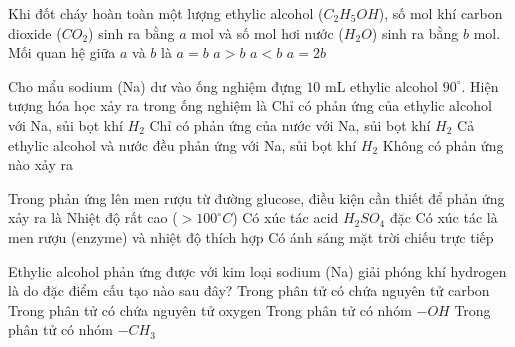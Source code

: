 \begin{ex}%
	Khi đốt cháy hoàn toàn một lượng ethylic alcohol ($C_2H_5OH$), số mol khí carbon dioxide ($CO_2$) sinh ra bằng $a$ mol và số mol hơi nước ($H_2O$) sinh ra bằng $b$ mol. Mối quan hệ giữa $a$ và $b$ là
	\choice
	{$a = b$}
	{$a > b$}
	{\True $a < b$}
	{$a = 2b$}
\end{ex}

\begin{ex}%
	Cho mẩu sodium (Na) dư vào ống nghiệm đựng $10$ mL ethylic alcohol $90^\circ$. Hiện tượng hóa học xảy ra trong ống nghiệm là
	\choice
	{Chỉ có phản ứng của ethylic alcohol với Na, sủi bọt khí $H_2$}
	{Chỉ có phản ứng của nước với Na, sủi bọt khí $H_2$}
	{\True Cả ethylic alcohol và nước đều phản ứng với Na, sủi bọt khí $H_2$}
	{Không có phản ứng nào xảy ra}
\end{ex}

\begin{ex}%
	Trong phản ứng lên men rượu từ đường glucose, điều kiện cần thiết để phản ứng xảy ra là
	\choice
	{Nhiệt độ rất cao ($> 100^\circ C$)}
	{Có xúc tác acid $H_2SO_4$ đặc}
	{\True Có xúc tác là men rượu (enzyme) và nhiệt độ thích hợp}
	{Có ánh sáng mặt trời chiếu trực tiếp}
\end{ex}

\begin{ex}%
	Ethylic alcohol phản ứng được với kim loại sodium (Na) giải phóng khí hydrogen là do đặc điểm cấu tạo nào sau đây?
	\choice
	{Trong phân tử có chứa nguyên tử carbon}
	{Trong phân tử có chứa nguyên tử oxygen}
	{\True Trong phân tử có nhóm $-OH$}
	{Trong phân tử có nhóm $-CH_3$}
\end{ex}


